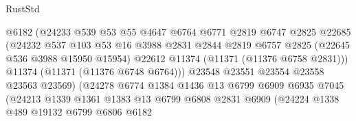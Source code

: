 \begin{lexlean}{RustStd}
\begin{coremodule}
                                  @6182
                                  (@24233
                                    @539
                                    @53
                                    @55
                                    @4647
                                    @6764
                                    @6771
                                    @2819
                                    @6747
                                    @2825
                                    @22685
                                    (@24232
                                      @537
                                      @103
                                      @53
                                      @16
                                      @3988
                                      @2831
                                      @2844
                                      @2819
                                      @6757
                                      @2825
                                      (@22645 @536 @3988 @15950 @15954)
                                      @22612
                                      @11374
                                      (@11371 (@11376 @6758 @2831)))
                                    @11374
                                    (@11371 (@11376 @6748 @6764)))
                                  @23548
                                  @23551
                                  @23554
                                  @23558
                                  @23563
                                  @23569)
                                (@24278
                                  @6774
                                  @1384
                                  @1436
                                  @13
                                  @6799
                                  @6909
                                  @6935
                                  @7045
                                  (@24213
                                    @1339
                                    @1361
                                    @1383
                                    @13
                                    @6799
                                    @6808
                                    @2831
                                    @6909
                                    (@24224
                                      @1338
                                      @489
                                      @19132
                                      @6799
                                      @6806
                                      @6182

\end{coremodule}
\end{lexlean}
